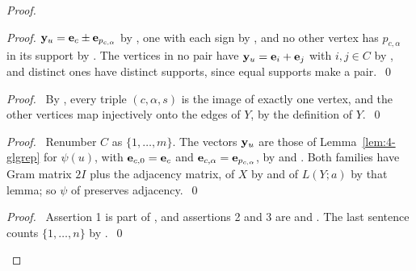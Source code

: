 \begin{proof}
\begin{proof}
  ${\mathbf y}_u={\mathbf e}_c\pm{\mathbf e}_{p_{c,\alpha}}$ by , one with each sign by
  , and no other vertex has $p_{c,\alpha}$ in its support by
  . The vertices in no pair have ${\mathbf y}_u={\mathbf e}_i+{\mathbf e}_j$ with $i,j\in C$ by
  , and distinct ones have distinct supports, since equal supports make a
  pair.~\qed\end{proof}
 \begin{proof}\pf\ By , every triple $(c,\alpha,s)$ is the image of exactly one
  vertex, and the other vertices map injectively onto the edges of $Y$, by the definition of
  $Y$.~\qed\end{proof}
 \begin{proof}\pf\ Renumber $C$ as $\{1,\dots,m\}$. The vectors ${\mathbf y}_u$ are those of
  Lemma~\ref{lem:4-glgrep} for $\psi(u)$, with ${\mathbf e}_{c,0}={\mathbf e}_c$ and
  ${\mathbf e}_{c,\alpha}={\mathbf e}_{p_{c,\alpha}}$, by  and . Both
  families have Gram matrix $2I$ plus the adjacency matrix, of $X$ by  and of
  $L(Y;a)$ by that lemma; so $\psi$ of  preserves adjacency.~\qed\end{proof}
 \qedstep
 \begin{proof}\pf\ Assertion 1 is part of , and assertions 2 and 3 are
   and . The last sentence counts $\{1,\dots,n\}$ by
  .~\qed\end{proof}
\end{proof}



